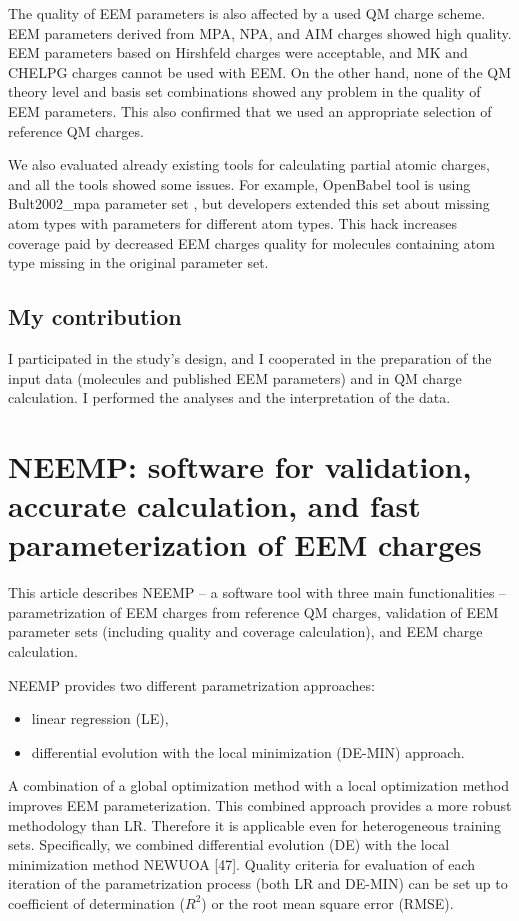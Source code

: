 The quality of EEM parameters is also affected by a used QM charge scheme.
EEM parameters derived from MPA, NPA, and AIM charges showed high quality.
EEM parameters based on Hirshfeld charges were acceptable, and MK and CHELPG
charges cannot be used with EEM.  On the other hand, none of the QM theory level
and basis set combinations showed any problem in the quality of EEM parameters.
This also confirmed that we used an appropriate selection of reference QM
charges.

We also evaluated already existing tools for calculating partial atomic charges,
and all the tools showed some issues. For example, OpenBabel tool is using
Bult2002_mpa parameter set \cite{Bultinck2002}, but developers extended this
set about missing atom types with parameters for different atom types. This hack
increases coverage paid by decreased EEM charges quality for molecules
containing atom type missing in the original parameter set.  

\subsection{My contribution}

I participated in the study's design, and I cooperated in the preparation of
the input data (molecules and published EEM parameters) and in QM charge 
calculation. I performed the analyses and the interpretation of the data.

\section{NEEMP: software for validation, accurate calculation, and fast
parameterization of EEM charges} \label{sec:neemp-article}

This article describes NEEMP -- a software tool with three main
functionalities -- parametrization of EEM charges from reference QM charges,
validation of EEM parameter sets (including quality and coverage calculation),
and EEM charge calculation.

NEEMP provides two different parametrization approaches:

\begin{itemize}
    \item linear regression (LE),
    \item differential evolution with the local minimization (DE-MIN) approach. 
\end{itemize}

A combination of a global optimization method with a local optimization method
improves EEM parameterization. This combined approach provides a more robust
methodology than LR. Therefore it is applicable even for heterogeneous training
sets. Specifically, we combined differential evolution (DE) with the local
minimization method NEWUOA [47]. Quality criteria for evaluation of each 
iteration of the parametrization process (both LR and DE-MIN) can be set up to
coefficient of determination ($R^2$) or the root mean square error (RMSE).

